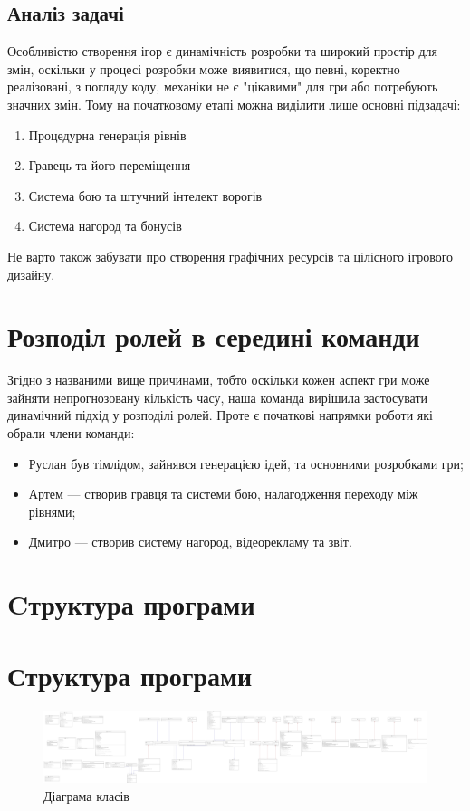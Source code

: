 \documentclass{article}
\begin{document}
\subsection{Аналіз задачі}
Особливістю створення ігор є динамічність розробки та широкий простір для змін,
оскільки у процесі розробки може виявитися, що певні, коректно реалізовані, з погляду коду,
механіки не є "цікавими" для гри або потребують значних змін.
Тому на початковому етапі можна виділити лише основні підзадачі:

\begin{enumerate}
	\item Процедурна генерація рівнів
	\item Гравець та його переміщення
	\item Система бою та штучний інтелект ворогів
	\item Система нагород та бонусів
\end{enumerate}

Не варто також забувати про створення графічних ресурсів та
цілісного ігрового дизайну.

\section{Розподіл ролей в середині команди}
Згідно з названими вище причинами, тобто оскільки кожен аспект гри може зайняти
непрогнозовану кількість часу, наша команда вирішила застосувати
динамічний підхід у розподілі ролей. Проте є початкові напрямки роботи які
обрали члени команди:
\begin{itemize}
	\item Руслан був тімлідом, зайнявся генерацією ідей, та основними розробками гри;
	\item Артем --- створив гравця та системи бою, налагодження переходу між рівнями;
	\item Дмитро --- створив систему нагород, відеорекламу та звіт.
\end{itemize}
\section{Cтруктура програми}
\section{Структура програми}
\begin{figure}[H]
	\centering
	\includegraphics[width=0.9 \textwidth]{uml.pdf}
	\caption{Діаграма класів}
\end{figure}
\end{document}
